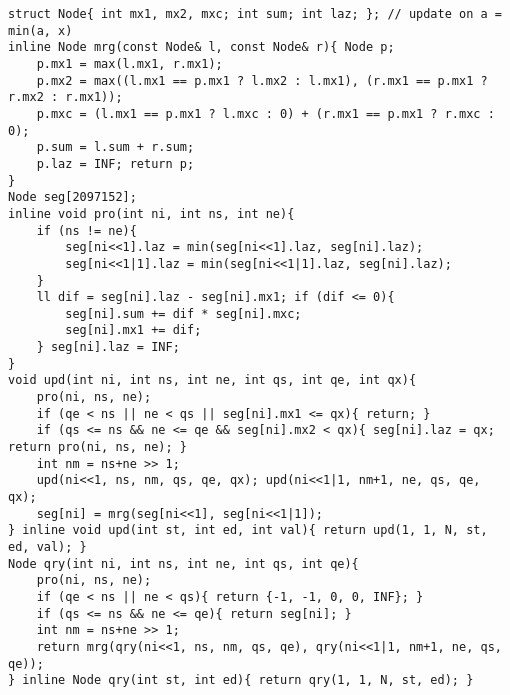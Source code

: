 \documentclass[landscape, 8pt, a4paper, oneside, twocolumn]{extarticle}
\begin{document}
\begin{verbatim}
struct Node{ int mx1, mx2, mxc; int sum; int laz; }; // update on a = min(a, x)
inline Node mrg(const Node& l, const Node& r){ Node p;
    p.mx1 = max(l.mx1, r.mx1);
    p.mx2 = max((l.mx1 == p.mx1 ? l.mx2 : l.mx1), (r.mx1 == p.mx1 ? r.mx2 : r.mx1));
    p.mxc = (l.mx1 == p.mx1 ? l.mxc : 0) + (r.mx1 == p.mx1 ? r.mxc : 0);
    p.sum = l.sum + r.sum;
    p.laz = INF; return p;
}
Node seg[2097152];
inline void pro(int ni, int ns, int ne){
    if (ns != ne){
        seg[ni<<1].laz = min(seg[ni<<1].laz, seg[ni].laz);
        seg[ni<<1|1].laz = min(seg[ni<<1|1].laz, seg[ni].laz);
    }
    ll dif = seg[ni].laz - seg[ni].mx1; if (dif <= 0){
        seg[ni].sum += dif * seg[ni].mxc;
        seg[ni].mx1 += dif;
    } seg[ni].laz = INF;
}
void upd(int ni, int ns, int ne, int qs, int qe, int qx){
    pro(ni, ns, ne);
    if (qe < ns || ne < qs || seg[ni].mx1 <= qx){ return; }
    if (qs <= ns && ne <= qe && seg[ni].mx2 < qx){ seg[ni].laz = qx; return pro(ni, ns, ne); }
    int nm = ns+ne >> 1;
    upd(ni<<1, ns, nm, qs, qe, qx); upd(ni<<1|1, nm+1, ne, qs, qe, qx);
    seg[ni] = mrg(seg[ni<<1], seg[ni<<1|1]);
} inline void upd(int st, int ed, int val){ return upd(1, 1, N, st, ed, val); }
Node qry(int ni, int ns, int ne, int qs, int qe){
    pro(ni, ns, ne);
    if (qe < ns || ne < qs){ return {-1, -1, 0, 0, INF}; }
    if (qs <= ns && ne <= qe){ return seg[ni]; }
    int nm = ns+ne >> 1;
    return mrg(qry(ni<<1, ns, nm, qs, qe), qry(ni<<1|1, nm+1, ne, qs, qe));
} inline Node qry(int st, int ed){ return qry(1, 1, N, st, ed); }
\end{verbatim}
\end{document}
